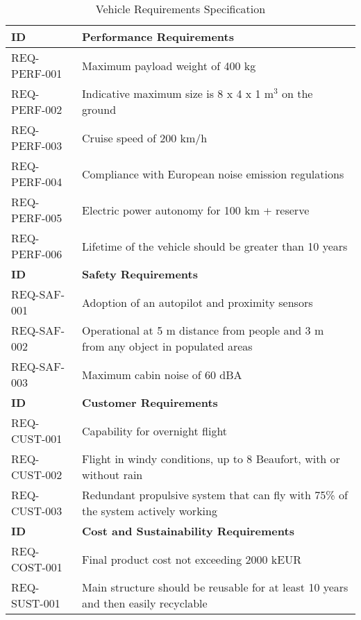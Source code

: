 \begin{table}[H]
\centering
\caption{Vehicle Requirements Specification}
\label{tab:vehicle_requirements}
\renewcommand{\arraystretch}{0.85}
\begin{tabularx}{\linewidth}{|l|>{\centering\arraybackslash}X|}
\hline
\textbf{ID} & \textbf{Performance Requirements} \\ \hline
REQ-PERF-001 & Maximum payload weight of 400 kg \\ \hline
REQ-PERF-002 & Indicative maximum size is 8 x 4 x 1 m\(^3\) on the ground \\ \hline
REQ-PERF-003 & Cruise speed of 200 km/h \\ \hline
REQ-PERF-004 & Compliance with European noise emission regulations \\ \hline
REQ-PERF-005 & Electric power autonomy for 100 km + reserve \\ \hline
REQ-PERF-006 & Lifetime of the vehicle should be greater than 10 years \\ \hline
\textbf{ID} & \textbf{Safety Requirements} \\ \hline
REQ-SAF-001 & Adoption of an autopilot and proximity sensors \\ \hline
REQ-SAF-002 & Operational at 5 m distance from people and 3 m from any object in populated areas \\ \hline
REQ-SAF-003 & Maximum cabin noise of 60 dBA \\ \hline
\textbf{ID} & \textbf{Customer Requirements} \\ \hline
REQ-CUST-001 & Capability for overnight flight \\ \hline
REQ-CUST-002 & Flight in windy conditions, up to 8 Beaufort, with or without rain \\ \hline
REQ-CUST-003 & Redundant propulsive system that can fly with 75\% of the system actively working \\ \hline
\textbf{ID} & \textbf{Cost and Sustainability Requirements} \\ \hline
REQ-COST-001 & Final product cost not exceeding 2000 kEUR \\ \hline
REQ-SUST-001 & Main structure should be reusable for at least 10 years and then easily recyclable \\ \hline
\end{tabularx}
\end{table}

